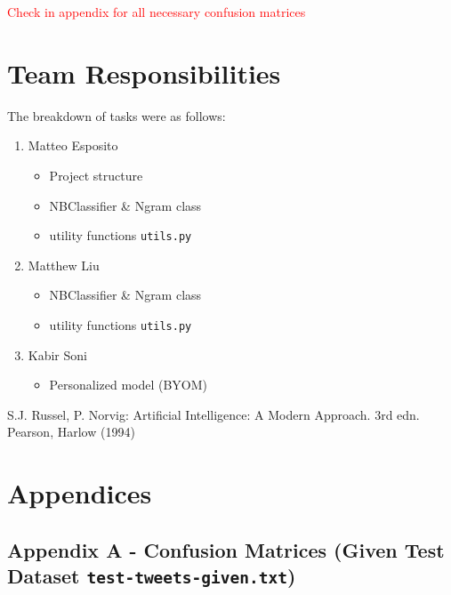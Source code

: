 \documentclass[runningheads]{llncs}
\newcommand{\code}[1]{\texttt{#1}}
\begin{document}
\newpage

\textcolor{red}{Check in appendix for all necessary confusion matrices}

\section{Team Responsibilities}

The breakdown of tasks were as follows:

\begin{enumerate}
    \item Matteo Esposito
    \begin{itemize}
        \item Project structure
        \item NBClassifier \& Ngram class
        \item utility functions \code{utils.py}
    \end{itemize}
    \item Matthew Liu
    \begin{itemize}
        \item NBClassifier \& Ngram class
        \item utility functions \code{utils.py}
    \end{itemize}
    \item Kabir Soni
    \begin{itemize}
        \item Personalized model (BYOM)
    \end{itemize}
\end{enumerate}

\begin{thebibliography}{8}
    
S.J. Russel, P. Norvig: Artificial Intelligence: A Modern Approach. 3rd edn. Pearson, Harlow (1994)

\end{thebibliography}

\section{Appendices}
\subsection{Appendix A - Confusion Matrices (Given Test Dataset \code{test-tweets-given.txt})}
\end{document}
